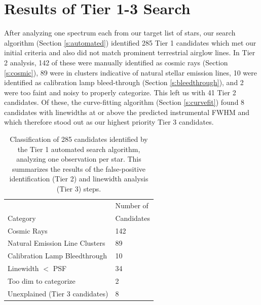 \documentclass[twocolumn]{aastex701}
\begin{document}
\section{Results of Tier 1-3 Search}
\label{s:results}
After analyzing one spectrum each from our target list of stars, our search algorithm (Section \ref{s:automated}) identified 285 Tier 1 candidates which met our initial criteria and also did not match prominent terrestrial airglow lines. In Tier 2 analysis, 142 of these were manually identified as cosmic rays (Section \ref{s:cosmic}), 89 were in clusters indicative of natural stellar emission lines,  10 were identified as calibration lamp bleed-through (Section \ref{s:bleedthrough}), and 2 were too faint and noisy to properly categorize. This left us with 41 Tier 2 candidates. Of these, the curve-fitting algorithm (Section \ref{s:curvefit}) found 8 candidates with linewidths at or above the predicted instrumental FWHM and which therefore stood out as our highest priority Tier 3 candidates. 

\begin{table}
\begin{center}
\begin{tabular}{|l|l|} 
 \hline
 & Number of \\
 Category & Candidates \\ 
 \hline
 Cosmic Rays & 142 \\ 
 Natural Emission Line Clusters & 89 \\ 
 Calibration Lamp Bleedthrough &  10 \\ 
 Linewidth $<$ PSF & 34 \\
 Too dim to categorize & 2 \\
 Unexplained (Tier 3 candidates) & 8 \\
 \hline
 \end{tabular}
\end{center}
\caption{Classification of 285 candidates identified by the Tier 1 automated search algorithm, analyzing one observation per star.  This summarizes the results of the false-positive identification (Tier 2) and linewidth analysis (Tier 3) steps.}
\label{table:classification}
\end{table}
\end{document}
